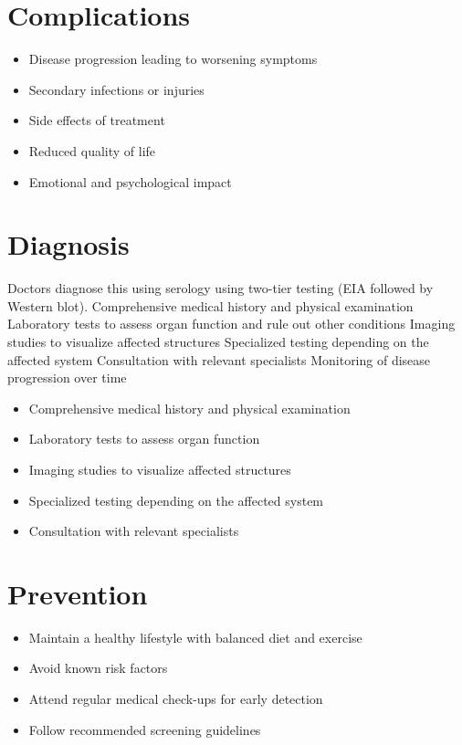 \section{Complications}
\begin{itemize}[noitemsep]
  \item Disease progression leading to worsening symptoms
  \item Secondary infections or injuries
  \item Side effects of treatment
  \item Reduced quality of life
  \item Emotional and psychological impact
\end{itemize}
\section{Diagnosis}
Doctors diagnose this using serology using two-tier testing (EIA followed by Western blot). Comprehensive medical history and physical examination Laboratory tests to assess organ function and rule out other conditions Imaging studies to visualize affected structures Specialized testing depending on the affected system Consultation with relevant specialists Monitoring of disease progression over time

\begin{itemize}[noitemsep]
  \item Comprehensive medical history and physical examination
  \item Laboratory tests to assess organ function
  \item Imaging studies to visualize affected structures
  \item Specialized testing depending on the affected system
  \item Consultation with relevant specialists
\end{itemize}
\section{Prevention}
\begin{itemize}[noitemsep]
  \item Maintain a healthy lifestyle with balanced diet and exercise
  \item Avoid known risk factors
  \item Attend regular medical check-ups for early detection
  \item Follow recommended screening guidelines
\end{itemize}
